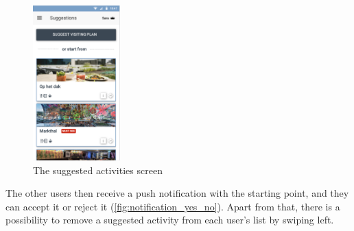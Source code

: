 \documentclass[11pt,a4paper,oneside]{article}
\begin{document}
\begin{figure}[H]
    \centering
    \includegraphics[width=0.3\textwidth]{paper/imgs/hifi_prototypes/results.png}
    \caption{The suggested activities screen}
    \label{fig:results_screen}
\end{figure}

The other users then receive a push notification with the starting point, and they can accept it or reject it (\autoref{fig:notification_yes_no}). Apart from that, there is a possibility to remove a suggested activity from each user's list by swiping left.

\begin{figure}[H]
    \centering
    \qquad
    \caption{}%
    \label{fig:notification_yes_no}%
\end{figure}
\end{document}
